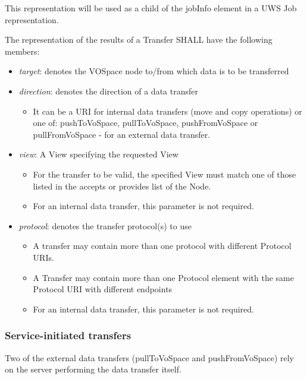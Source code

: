 \documentclass[11pt,a4paper]{ivoa}
\begin{document}
This representation will be used as a child of the jobInfo element in a UWS Job representation.

The representation of the results of a Transfer SHALL have the following members:

\begin{itemize}
    \item \emph{target}: denotes the VOSpace node to/from which data is to be transferred
    \item \emph{direction}: denotes the direction of a data transfer
        \begin{itemize}
            \item It can be a URI for internal data transfers (move and copy operations) or one of: pushToVoSpace, pullToVoSpace, pushFromVoSpace or pullFromVoSpace - for an external data transfer.
        \end{itemize}
    \item \emph{view}: A View specifying the requested View
        \begin{itemize}
            \item For the transfer to be valid, the specified View must match one of those listed in the accepts or provides list of the Node.
            \item For an internal data transfer, this parameter is not required.
        \end{itemize}
    \item \emph{protocol}: denotes the transfer protocol(s) to use
        \begin{itemize}
            \item A transfer may contain more than one protocol with different Protocol URIs.
            \item A Transfer may contain more than one Protocol element with the same Protocol URI with different endpoints
            \item For an internal data transfer, this parameter is not required.
        \end{itemize}
\end{itemize}

\subsubsection{Service-initiated transfers}
\label{subsubsec:service-initiated transfers}
Two of the external data transfers (pullToVoSpace and pushFromVoSpace) rely on the server performing the data transfer itself.
\end{document}
